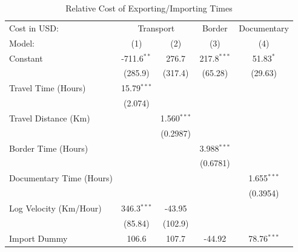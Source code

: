 \documentclass[a4paper]{article}
\begin{document}
\begin{table}[H] \vspace{-2mm}
   \centering
   \caption{\label{tab:RCTime} Relative Cost of Exporting/Importing Times}
   \vspace{-1mm}
   \begin{tabular}{lcccc}
      \tabularnewline \toprule
      Cost in USD: & \multicolumn{2}{c}{Transport} & Border & Documentary\\
      Model:                                       & (1)           & (2)           & (3)           & (4)\\  
      \midrule
      Constant                                     & -711.6$^{**}$ & 276.7         & 217.8$^{***}$ & 51.83$^{*}$\\   
                                                   & (285.9)       & (317.4)       & (65.28)       & (29.63)\\   
      Travel Time (Hours)                                 & 15.79$^{***}$ &               &               &   \\   
                                                   & (2.074)       &               &               &   \\   
      Travel Distance (Km)                         &               & 1.560$^{***}$ &               &   \\   
                                                   &               & (0.2987)      &               &   \\   
      Border Time (Hours)                          &               &               & 3.988$^{***}$ &   \\   
                                                   &               &               & (0.6781)      &   \\   
      Documentary Time (Hours)                            &               &               &               & 1.655$^{***}$\\   
                                                   &               &               &               & (0.3954)\\   
      Log Velocity (Km/Hour)                           & 346.3$^{***}$ & -43.95        &               &   \\   
                                                   & (85.84)       & (102.9)       &               &   \\   
      Import Dummy                               & 106.6         & 107.7         & -44.92        & 78.76$^{***}$\\   

\end{tabular}
\end{table}
\end{document}
